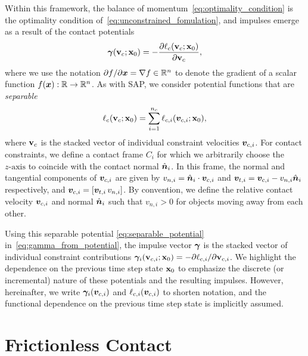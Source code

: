 Within this framework, the balance of momentum~\eqref{eq:optimality_condition}
is the optimality condition of~\eqref{eq:unconstrained_fomulation}, and impulses
emerge as a result of the contact potentials
\begin{eqnarray}
    \bgamma(\mf{v}_c; \mf{x}_0) = -\frac{\partial\ell_c(\mf{v}_c;
    \mf{x}_0)}{\partial\mf{v}_c},
    \label{eq:gamma_from_potential}
\end{eqnarray}
where we use the notation $\partial f/\partial{\bm{x}} = \nabla f \in\mathbb{R}^n$
to denote the gradient of a scalar function $f({\bm{x}}):
\mathbb{R}\rightarrow\mathbb{R}^n$. As with SAP, we consider potential functions
that are
\emph{separable}
\begin{eqnarray}
    \ell_c(\mf{v}_c; \mf{x}_0) = \sum_{i=1}^{n_c}\ell_{c,i}(\vf{v}_{c,i};
    \mf{x}_0),
    \label{eq:separable_potential}
\end{eqnarray}
where ${\mathbf{v}}_c$ is the stacked vector of individual constraint velocities
${\bm{v}}_{c,i}$. For contact constraints, we define a contact frame $C_i$ for
which we arbitrarily choose the $z\text{-axis}$ to coincide with the contact
normal $\hat{{\bm{n}}}_i$. In this frame, the normal and tangential components of
${\bm{v}}_{c,i}$ are given by $v_{n,i} = \hat{{\bm{n}}}_i\cdot{\bm{v}}_{c,i}$ and
${\bm{v}}_{t,i} = {\bm{v}}_{c,i}-v_{n,i}\hat{{\bm{n}}}_i$ respectively, and
${\bm{v}}_{c,i}=[{\bm{v}}_{t,i}\,v_{n,i}]$. By convention, we define the relative
contact velocity ${\bm{v}}_{c,i}$ and normal $\hat{{\bm{n}}}_i$ such that $v_{n,i} >
0$ for objects moving away from each other.

Using this separable potential \eqref{eq:separable_potential}
in~\eqref{eq:gamma_from_potential}, the impulse vector ${\bm\gamma}$ is the stacked
vector of individual constraint contributions ${\bm\gamma}_i({\mathbf{v}}_{c,i}; {\mathbf{x}}_0)
= -\partial\ell_{c,i}/\partial{\mathbf{v}}_{c,i}$. We highlight the dependence
on the previous time step state ${\mathbf{x}}_0$ to emphasize the discrete (or
incremental) nature of these potentials and the resulting impulses. However,
hereinafter, we write ${\bm\gamma}_i({\bm{v}}_{c,i})$ and $\ell_{c,i}({\bm{v}}_{c,i})$ to
shorten notation, and the functional dependence on the previous time step state
is implicitly assumed.

\section{Frictionless Contact}
\label{sec:frictionless_contact}

